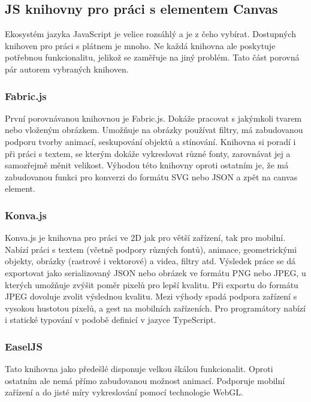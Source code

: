         \subsection{JS knihovny pro práci s elementem Canvas}
        Ekosystém jazyka JavaScript je velice rozsáhlý a je z čeho vybírat. Dostupných knihoven pro práci s plátnem je mnoho.
        Ne každá knihovna ale poskytuje potřebnou funkcionalitu,
        jelikož se zaměřuje na jiný problém. Tato část porovná pár autorem vybraných knihoven.

            \subsubsection{Fabric.js}
            První porovnávanou knihovnou je Fabric.js. Dokáže pracovat s jakýmkoli tvarem nebo vloženým obrázkem. Umožňuje na obrázky používat filtry,
            má zabudovanou podporu tvorby animací, seskupování objektů a stínování. Knihovna si poradí i při práci s textem, se kterým dokáže vykreslovat různé fonty,
            zarovnávat jej a samozřejmě měnit velikost.
            Výhodou této knihovny oproti ostatním je, že má zabudovanou funkci pro konverzi do formátu SVG nebo JSON a zpět na canvas element.  
            
            \subsubsection{Konva.js}
            Konva.js je knihovna pro práci ve 2D jak pro větší zařízení, tak pro mobilní. Nabízí práci s textem (včetně podpory různých fontů),
            animace, geometrickými objekty, obrázky (rastrové i vektorové) a videa, filtry atd. Výsledek práce se dá exportovat jako serializovaný
            JSON nebo obrázek ve formátu PNG nebo JPEG, u kterých umožňuje zvýšit poměr pixelů pro lepší kvalitu.
            Při exportu do formátu JPEG dovoluje zvolit výslednou kvalitu. Mezi výhody spadá podpora zařízení s vysokou hustotou pixelů, a gest na mobilních zařízeních.
            Pro programátory nabízí i statické typování v podobě definicí v jazyce TypeScript. 

            \subsubsection{EaselJS}
            Tato knihovna jako předešlé disponuje velkou škálou funkcionalit.
            Oproti ostatním ale nemá přímo zabudovanou možnost animací.
            Podporuje mobilní zařízení a do jisté míry vykreslování pomocí technologie WebGL.

